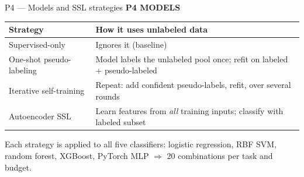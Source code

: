 \documentclass[aspectratio=169,11pt]{beamer}
\newcommand{\sectiontag}[1]{{\footnotesize\usebeamercolor[fg]{structure}\textbf{#1}}\par\vspace{0.10cm}}
\newcommand{\smallmuted}[1]{{\footnotesize\color{slate}#1\par}}
\begin{document}
\begin{frame}{P4 — Models and SSL strategies}
\sectiontag{P4 \quad MODELS}
\renewcommand{\arraystretch}{1.30}
{\small
\begin{tabularx}{\linewidth}{@{}P{3.6cm}Y@{}}\toprule
\textbf{Strategy} & \textbf{How it uses unlabeled data}\\\midrule
{} Supervised-only & Ignores it (baseline)\\
 One-shot pseudo-labeling & Model labels the unlabeled pool once; refit on labeled + pseudo-labeled\\
 Iterative self-training & Repeat: add confident pseudo-labels, refit, over several rounds\\
 Autoencoder SSL & Learn features from \emph{all} training inputs; classify with labeled subset\\\bottomrule
\end{tabularx}\par}
\vspace{0.15cm}
\smallmuted{Each strategy is applied to all five classifiers: logistic regression, RBF SVM, random forest, XGBoost, PyTorch MLP $\Rightarrow$ 20 combinations per task and budget.}
\end{frame}
\end{document}

